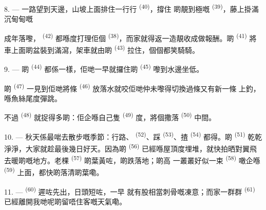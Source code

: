 8. --- 一路望到天邊，山坡上面排住一行行 \textsuperscript{(40)}，撐住
啲靚到極嘅 \textsuperscript{(39)}，藤上掛滿沉甸甸嘅

成年落嚟， \textsuperscript{(42)} 都喺度打理佢個
\textsuperscript{(38)}，而家就得返一造靚收成做報酬。啲
\textsuperscript{(41)} 將車上面啲盆裝到滿瀉，架車就由啲 \textsuperscript{(43)}
拉住，個個都笑騎騎。

\VUsaut{5.0mm}
\VUsaut{3.4mm}

9. --- 啲 \textsuperscript{(44)} 都係一樣，佢哋一早就攞住啲
 \textsuperscript{(45)} 嚟到水邊坐低。

啲 \textsuperscript{(47)} 一見到佢哋將條 \textsuperscript{(46)}
放落水就咬佢哋仲未嚟得切換過條又有新一條
上釣，喺魚絲尾度彈跳。

不過 \textsuperscript{(48)} 就捉得多啲：佢企喺自己隻
\textsuperscript{(49)} 度，將個撒落 \textsuperscript{(50)} 中間。

10. --- 秋天係最啱去散步嘅季節：行路、 \textsuperscript{(52)}、踩
 \textsuperscript{(53)}、揸 \textsuperscript{(54)} 都得。啲
 \textsuperscript{(51)} 乾乾淨淨，大家就趁最後幾日好天。因為啲
\textsuperscript{(56)} 已經喺屋頂度埋堆，就快拍晒對翼飛去暖啲嘅地方。老棵
 \textsuperscript{(57)} 啲葉黃咗，啲跌落地；啲高
一叢叢好似一束 \textsuperscript{(58)} 噉企喺
\textsuperscript{(59)} 上面，都快啲落清啲葉嘞。

11. ---  \textsuperscript{(60)} 遲咗先出，日頭短咗，一早
就有股相當刺骨嘅凍意；而家一群群 \textsuperscript{(61)}
已經離開我哋呢啲留唔住客嘅天氣嘞。

\VUsaut{6.0mm}
\VUfilet{22mm}
